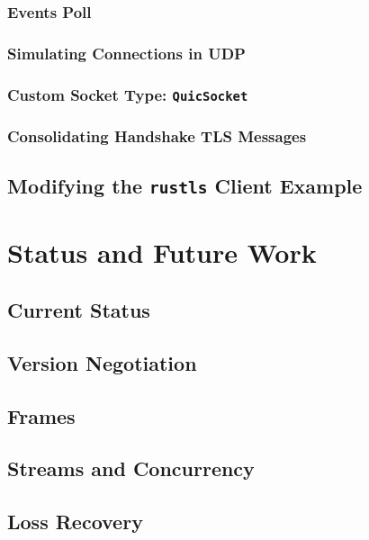 \documentclass{l4proj}
\begin{document}
\subsection{Events Poll}

\subsection{Simulating Connections in UDP}

\subsection{Custom Socket Type: \texttt{QuicSocket}}

\subsection{Consolidating Handshake TLS Messages}

\section{Modifying the \texttt{rustls} Client Example}


\pagebreak


\chapter{Status and Future Work}

\section{Current Status}

\section{Version Negotiation}

\section{Frames}

\section{Streams and Concurrency}

\section{Loss Recovery}
\end{document}
